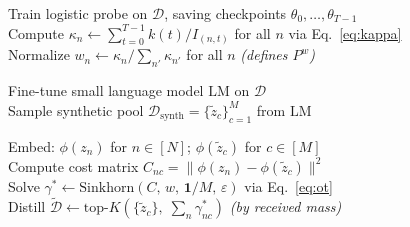 \begin{center}
  \begin{minipage}{0.99\linewidth}
    \begin{algorithm}[H]

      \caption{Trajectory-Aware Knowledge Estimation (\textbf{TAKE})}
      \label{alg:take}


      \vspace{-0.5\baselineskip}
      \Comment{\noindent\hrulefill}

      \vspace{0.5\baselineskip}
      Train logistic probe on $\mathcal{D}$, saving checkpoints $\theta_0, \ldots, \theta_{T-1}$ \\
      Compute $\kappa_n \leftarrow \textstyle\sum_{t=0}^{T-1} k(t) / I_{(n,t)}$ for all $n$ \hfill via Eq.~\ref{eq:kappa} \\
      Normalize $w_n \leftarrow \kappa_n / \sum_{n'} \kappa_{n'}$ for all $n$ \hfill\textit{(defines $P^w$)}

      \vspace{0.5\baselineskip}
      Fine-tune small language model $\mathrm{LM}$ on $\mathcal{D}$ \\
      Sample synthetic pool $\mathcal{D}_\text{synth} = \{\tilde{z}_c\}_{c=1}^{M}$ from $\mathrm{LM}$

      \vspace{0.5\baselineskip}
      Embed: $\phi(z_n)$ for $n \in [N]$; $\phi(\tilde{z}_c)$ for $c \in [M]$ \\
      Compute cost matrix $C_{nc} = \|\phi(z_n) - \phi(\tilde{z}_c)\|^2$ \\
      Solve $\gamma^* \leftarrow \mathrm{Sinkhorn}(C,\, w,\, \mathbf{1}/M,\, \varepsilon)$ \hfill via Eq.~\ref{eq:ot} \\
      Distill $\tilde{\mathcal{D}} \leftarrow \mathrm{top}\text{-}K\!\left(\{\tilde{z}_c\},\; \textstyle\sum_n \gamma^*_{nc}\right)$ \hfill\textit{(by received mass)}

      \vspace{0.5\baselineskip}
    \end{algorithm}
  \end{minipage}
\end{center}
